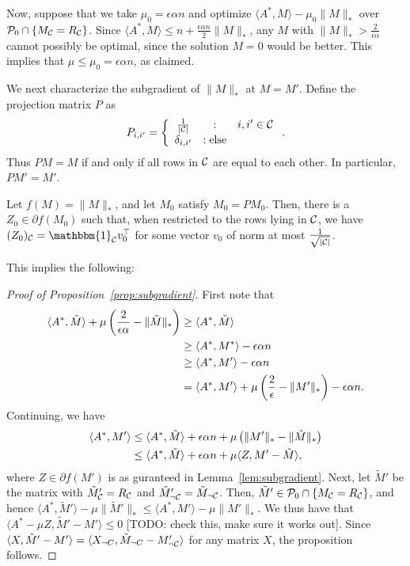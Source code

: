 \documentclass[11pt]{article}
\newcommand{\M}{\tilde{M}}
\newcommand{\Aa}{A^*}
\newcommand{\bi}{\mathbbm{1}}
\newcommand{\todo}[1]{{\color{red} [TODO: {#1}]}}
\begin{document}
Now, suppose that we take $\mu_0 = \epsilon \alpha n$ and optimize $\langle \Aa, M \rangle - \mu_0\|M\|_*$ over 
$\mathcal{P}_0 \cap \{M_{\mathcal{C}} = R_{\mathcal{C}}\}$. Since $\langle \Aa, M \rangle \leq n + \frac{\epsilon \alpha n}{2}\|M\|_*$, 
any $M$ with $\|M\|_* > \frac{2}{\epsilon\alpha}$ cannot possibly be optimal, since the solution $M = 0$ would 
be better. This implies that $\mu \leq \mu_0 = \epsilon \alpha n$, as claimed.

We next characterize the subgradient of $\|M\|_*$ at $M = M'$.
Define the projection matrix $P$ as
\[ P_{i,i'} = \left\{ \begin{array}{ccl} \frac{1}{|\mathcal{C}|} & : & i, i' \in \mathcal{C} \\ \delta_{i,i'} & : \text{else} \end{array} \right.. \]
Thus $PM = M$ if and only if all rows in $\mathcal{C}$ are equal to each other.
In particular, $PM' = M'$.
\begin{lemma}
\label{lem:subgradient}
Let $f(M) = \|M\|_*$, and let 
$M_0$ satisfy $M_0 = PM_0$. Then,
there is a $Z_0 \in \partial f(M_0)$ such that, when restricted 
to the rows lying in $\mathcal{C}$, we have $(Z_0)_{\sC} = \bi_{\sC} v_0^{\top}$
for some vector $v_0$ of norm at most $\frac{1}{\sqrt{|\mathcal{C}|}}$.
\end{lemma}
This implies the following:

\begin{proof}[Proof of Proposition~\ref{prop:subgradient}]
First note that
\begin{align}
\langle \Aa, \M \rangle + \mu \p{\frac{2}{\epsilon\alpha} - \|\M\|_*} 
 &\geq \langle \Aa, \M \rangle \\
 &\geq \langle \Aa, M^* \rangle - \epsilon\alpha n \\
 &\geq \langle \Aa, M' \rangle - \epsilon\alpha n \\
 &= \langle \Aa, M' \rangle + \mu\p{\frac{2}{\epsilon} - \|M'\|_*} - \epsilon\alpha n.
\end{align}
Continuing, we have
\begin{align}
\langle \Aa, M' \rangle &\leq \langle \Aa, \M \rangle + \epsilon\alpha n + \mu\p{\|M'\|_* - \|\M\|_*} \\
 &\leq \langle A^*, \M \rangle + \epsilon \alpha n + \mu \langle Z, M' - \M \rangle,
\end{align}
where $Z \in \partial f(M')$ is as guranteed in Lemma~\ref{lem:subgradient}. Next, let 
$\M'$ be the matrix with $\M'_{\sC} = R_{\sC}$ and $\M'_{\neg \sC} = \M_{\neg \sC}$. Then, 
$\M' \in \sP_0 \cap \{M_{\sC} = R_{\sC}\}$, and hence 
$\langle \Aa, \M' \rangle - \mu \|\M'\|_* \leq \langle \Aa, M' \rangle - \mu \|M'\|_*$. 
We thus have that $\langle \Aa - \mu Z, \M' - M' \rangle \leq 0$ \todo{check this, make sure it works out}. Since 
$\langle X, \M' - M' \rangle = \langle X_{\neg C}, \M_{\neg C} - M'_{\neg \sC} \rangle$ for 
any matrix $X$, the proposition follows.
\end{proof}
\end{document}
